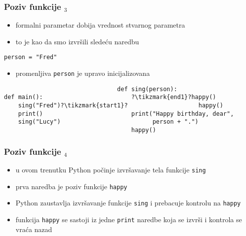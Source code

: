 \documentclass[utf8,compress,aspectratio=169]{beamer}
\begin{document}
\begin{frame}[fragile]
  \frametitle{Poziv funkcije $_3$}
  \begin{itemize}
    \item formalni parametar dobija vrednost stvarnog parametra
    \item to je kao da smo izvršili sledeću naredbu
  \end{itemize}
\begin{verbatim}
person = "Fred"
\end{verbatim}
  \begin{itemize}
    \item promenljiva \texttt{person} je upravo inicijalizovana
  \end{itemize}
\begin{verbatim}
                                def sing(person):
def main():                         ?\tikzmark{end1}?happy()
    sing("Fred")?\tikzmark{start1}?                    happy()
    print()                         print("Happy birthday, dear",
    sing("Lucy")                          person + ".")
                                    happy()
\end{verbatim}
\end{frame}

\begin{frame}[fragile]
  \frametitle{Poziv funkcije $_4$}
  \begin{itemize}
    \item u ovom trenutku Python počinje izvršavanje tela funkcije \texttt{sing}
    \item prva naredba je poziv funkcije \texttt{happy}
    \item Python zaustavlja izvršavanje funkcije \texttt{sing} i prebacuje kontrolu na \texttt{happy}
    \item funkcija \texttt{happy} se sastoji iz jedne \texttt{print} naredbe koja se izvrši i kontrola se vraća nazad
  \end{itemize}
\end{frame}
\end{document}
